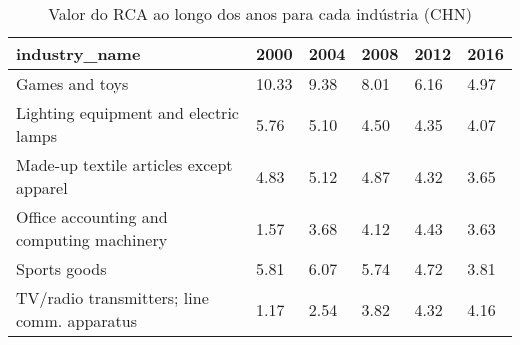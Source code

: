 \begin{table}
\centering
\caption{Valor do RCA ao longo dos anos para cada indústria (CHN)}
\begin{tabular}{p{6cm}p{1.5cm}p{1.5cm}p{1.5cm}p{1.5cm}p{1.5cm}}
\toprule
                              industry\_name &  2000 & 2004 & 2008 & 2012 & 2016 \\
\midrule
                             Games and toys & 10.33 & 9.38 & 8.01 & 6.16 & 4.97 \\
      Lighting equipment and electric lamps &  5.76 & 5.10 & 4.50 & 4.35 & 4.07 \\
    Made-up textile articles except apparel &  4.83 & 5.12 & 4.87 & 4.32 & 3.65 \\
  Office accounting and computing machinery &  1.57 & 3.68 & 4.12 & 4.43 & 3.63 \\
                               Sports goods &  5.81 & 6.07 & 5.74 & 4.72 & 3.81 \\
TV/radio transmitters; line comm. apparatus &  1.17 & 2.54 & 3.82 & 4.32 & 4.16 \\
\bottomrule
\end{tabular}
\end{table}

